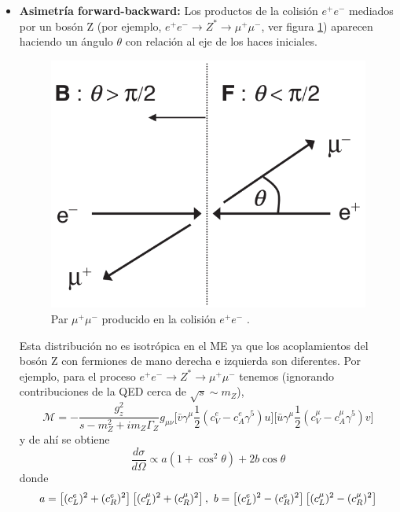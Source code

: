 \begin{itemize}
	\item \textbf{Asimetría forward-backward:} Los productos de la colisión $e^+e^-$ mediados por un bosón Z (por ejemplo, $e^+e^- \to Z^* \to \mu^+\mu^-$, ver figura \ref{eeZmumu}) aparecen haciendo un ángulo $\theta$ con relación al eje de los haces iniciales. 
\begin{figure}[h]
\centering
\includegraphics[scale=0.2]{Images/A_FB.png}
\caption[Par $\mu^+\mu^-$ producido en la colisión $e^+e^-$]{Par $\mu^+\mu^-$ producido en la colisión $e^+e^-$ \cite{thomson2013modern}.}
\label{eeZmumu}
\end{figure}	
	
	Esta distribución no es isotrópica en el ME ya que los acoplamientos del bosón Z con fermiones de mano derecha e izquierda son diferentes. Por ejemplo, para el proceso $e^+e^- \to Z^* \to \mu^+\mu^-$ tenemos (ignorando contribuciones de la QED cerca de $\sqrt{s}\sim m_Z$),
\[
\mathcal{M} = - \frac{g_z^2}{s-m_Z^2+i m_Z \Gamma_Z} g_{\mu \nu}\bigg[ \bar{v} \gamma^\mu \frac{1}{2} \left( c_V^e -c_A^e \gamma^5 \right) u \bigg] \bigg[ \bar{u} \gamma^\mu \frac{1}{2} \left( c_V^\mu -c_A^\mu \gamma^5 \right) v \bigg]
\]
y de ahí se obtiene
\begin{equation}
\frac{d\sigma}{d\Omega} \propto  a (1+\cos^2\theta) + 2b \cos \theta 
\end{equation}
donde
\begin{equation}
a = \left[ (c^e_L)^2+(c^e_R)^2 \right]\left[ (c^\mu_L)^2+(c^\mu_R)^2 \right], \hspace{0.05in} b = \left[ (c^e_L)^2-(c^e_R)^2 \right]\left[ (c^\mu_L)^2-(c^\mu_R)^2 \right]
\end{equation}


\end{itemize}

